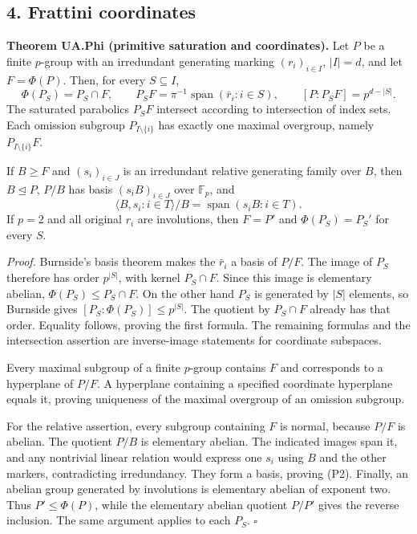 \documentclass[
  11pt,
  a4paper,
]{article}
\begin{document}
\subsection{4. Frattini coordinates}\label{frattini-coordinates}

\textbf{Theorem UA.Phi (primitive saturation and coordinates).} Let
\(P\) be a finite \(p\)-group with an irredundant generating marking
\((r_i)_{i\in I}\), \(|I|=d\), and let \(F=\Phi(P)\). Then, for every
\(S\subseteq I\), \[
\Phi(P_S)=P_S\cap F,\qquad
P_SF=\pi^{-1}\operatorname{span}(\bar r_i:i\in S),\qquad
[P:P_SF]=p^{d-|S|}.
\tag{P1}
\] The saturated parabolics \(P_SF\) intersect according to intersection
of index sets. Each omission subgroup \(P_{I\setminus\{i\}}\) has
exactly one maximal overgroup, namely \(P_{I\setminus\{i\}}F\).

If \(B\geq F\) and \((s_i)_{i\in J}\) is an irredundant relative
generating family over \(B\), then \(B\unlhd P\), \(P/B\) has basis
\((s_iB)_{i\in J}\) over \(\mathbb F_p\), and \[
\langle B,s_i:i\in T\rangle/B=\operatorname{span}(s_iB:i\in T).
\tag{P2}
\] If \(p=2\) and all original \(r_i\) are involutions, then \(F=P'\)
and \(\Phi(P_S)=P_S'\) for every \(S\).

\emph{Proof.} Burnside's basis theorem makes the \(\bar r_i\) a basis of
\(P/F\). The image of \(P_S\) therefore has order \(p^{|S|}\), with
kernel \(P_S\cap F\). Since this image is elementary abelian,
\(\Phi(P_S)\leq P_S\cap F\). On the other hand \(P_S\) is generated by
\(|S|\) elements, so Burnside gives \([P_S:\Phi(P_S)]\leq p^{|S|}\). The
quotient by \(P_S\cap F\) already has that order. Equality follows,
proving the first formula. The remaining formulas and the intersection
assertion are inverse-image statements for coordinate subspaces.

Every maximal subgroup of a finite \(p\)-group contains \(F\) and
corresponds to a hyperplane of \(P/F\). A hyperplane containing a
specified coordinate hyperplane equals it, proving uniqueness of the
maximal overgroup of an omission subgroup.

For the relative assertion, every subgroup containing \(F\) is normal,
because \(P/F\) is abelian. The quotient \(P/B\) is elementary abelian.
The indicated images span it, and any nontrivial linear relation would
express one \(s_i\) using \(B\) and the other markers, contradicting
irredundancy. They form a basis, proving (P2). Finally, an abelian group
generated by involutions is elementary abelian of exponent two. Thus
\(P'\leq\Phi(P)\), while the elementary abelian quotient \(P/P'\) gives
the reverse inclusion. The same argument applies to each \(P_S\).
\(\square\)
\end{document}
